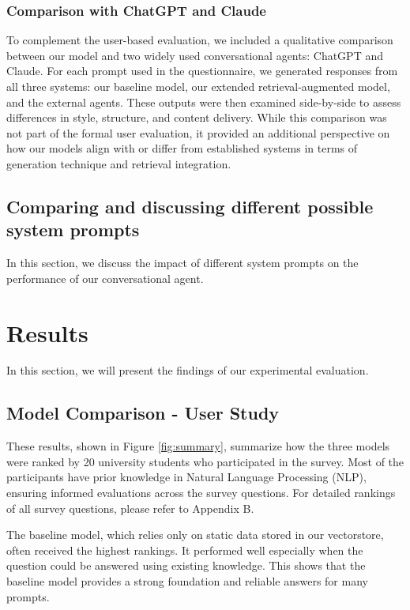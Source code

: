 \documentclass[fleqn,moreauthors,10pt]{ds_report}
\begin{document}
\subsubsection*{Comparison with ChatGPT and Claude}

To complement the user-based evaluation, we included a qualitative comparison between our model and two widely used conversational agents: ChatGPT and Claude. For each prompt used in the questionnaire, we generated responses from all three systems: our baseline model, our extended retrieval-augmented model, and the external agents. These outputs were then examined side-by-side to assess differences in style, structure, and content delivery. While this comparison was not part of the formal user evaluation, it provided an additional perspective on how our models align with or differ from established systems in terms of generation technique and retrieval integration.


\subsection*{Comparing and discussing different possible system prompts}
In this section, we discuss the impact of different system prompts on the performance of our conversational agent.


\section*{Results}

In this section, we will present the findings of our experimental evaluation.

\subsection*{Model Comparison - User Study}

These results, shown in Figure \ref{fig:summary}, summarize how the three models were ranked by 20 university students who participated in the survey. Most of the participants have prior knowledge in Natural Language Processing (NLP), ensuring informed evaluations across the survey questions. For detailed rankings of all survey questions, please refer to Appendix B.


The baseline model, which relies only on static data stored in our vectorstore, often received the highest rankings. It performed well especially when the question could be answered using existing knowledge. This shows that the baseline model provides a strong foundation and reliable answers for many prompts.
\end{document}
